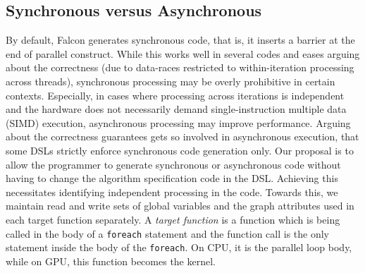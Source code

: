 \documentclass[12pt]{article}
\begin{document}
\subsection{Synchronous versus Asynchronous}\label{sec:syncasync}
By default, Falcon generates synchronous code, that is, it inserts a barrier at the end of parallel construct. 
While this works well in several codes and eases arguing about the correctness (due to data-races restricted to within-iteration processing across threads), synchronous processing may be overly prohibitive in certain contexts.
Especially, in cases where processing across iterations is independent and the hardware does not necessarily demand single-instruction multiple data (SIMD) execution, asynchronous processing may improve performance.
Arguing about the correctness guarantees gets so involved in asynchronous execution, that some DSLs strictly enforce synchronous code generation only.
Our proposal is to allow the programmer to generate synchronous or asynchronous code without having to change the algorithm specification code in the DSL.
Achieving this necessitates identifying independent processing in the code. 
Towards this, we maintain read and write sets of global variables and the graph attributes used in each target function separately. A \textit{target function} is a function which is being called in the body of a \texttt{foreach} statement and the function call is the only statement inside the body of the \texttt{foreach}.  On CPU, it is the parallel loop body, while on GPU, this function becomes the kernel.
\end{document}
